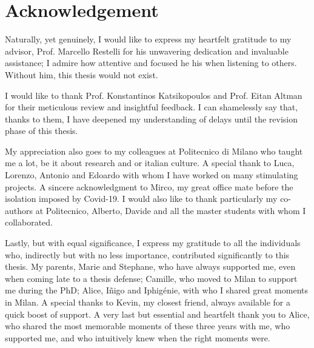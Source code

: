 












\chapter*{Acknowledgement}

Naturally, yet genuinely, I would like to express my heartfelt gratitude to my advisor, Prof. Marcello Restelli for his unwavering dedication and invaluable assistance; 
I admire how attentive and focused he his when listening to others.
Without him, this thesis would not exist. 

I would like to thank Prof. Konstantinos Katsikopoulos and Prof. Eitan Altman for their meticulous review and insightful feedback. 
I can shamelessly say that, thanks to them, I have deepened my understanding of delays until the revision phase of this thesis.

My appreciation also goes to my colleagues at Politecnico di Milano who taught me a lot, be it about research and or italian culture.  
A special thank to Luca, Lorenzo, Antonio and Edoardo with whom I have worked on many stimulating projects. 
A sincere acknowledgment to Mirco, my great office mate before the isolation imposed by Covid-19.
I would also like to thank particularly my co-authors at Politecnico, Alberto, Davide and all the master students with whom I collaborated.

Lastly, but with equal significance, I express my gratitude to all the individuals who, indirectly but with no less importance, contributed significantly to this thesis.
My parents, Marie and Stephane, who have always supported me, even when coming late to a thesis defense; Camille, who moved to Milan to support me during the PhD; Alice, I\~{n}igo and Iphig\'enie, with who I shared great moments in Milan.
A special thanks to Kevin, my closest friend, always available for a quick boost of support.
A very last but essential and heartfelt thank you to Alice, who shared the most memorable moments of these three years with me, who supported me, and who intuitively knew when the right moments were.
